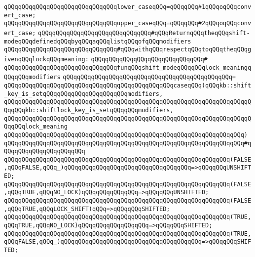 \verb|qQQqqQQqqQQqqQQqqQQqqQQqqQQqqQQqlower_caseqQQq=qQQqqQQq#1qQQqoqQQqconvert_case;|\newline
\verb|qQQqqQQqqQQqqQQqqQQqqQQqqQQqqQQqupper_caseqQQq=qQQqqQQq#2qQQqoqQQqconvert_case;|\newline
\newline
\verb|qQQqqQQqqQQqqQQqqQQqqQQqqQQqqQQq#qQQqReturnqQQqtheqQQqshift-modeqQQqdefinedqQQqbyqQQqaqQQqlistqQQqofqQQqmodifiers|\newline
\verb|qQQqqQQqqQQqqQQqqQQqqQQqqQQqqQQq#qQQqwithqQQqrespectqQQqtoqQQqtheqQQqgivenqQQqlockqQQqmeaning:|\newline
\verb|qQQqqQQqqQQqqQQqqQQqqQQqqQQqqQQq#|\newline
\verb|qQQqqQQqqQQqqQQqqQQqqQQqqQQqqQQqfunqQQqshift_modeqQQqqQQqlock_meaningqQQqqQQqmodifiers|\newline
\verb|qQQqqQQqqQQqqQQqqQQqqQQqqQQqqQQqqQQqqQQqqQQqqQQq=|\newline
\verb|qQQqqQQqqQQqqQQqqQQqqQQqqQQqqQQqqQQqqQQqqQQqqQQqcaseqQQq(qQQqkb::shift_key_is_setqQQqqQQqqQQqqQQqqQQqqQQqmodifiers,|\newline
\verb|qQQqqQQqqQQqqQQqqQQqqQQqqQQqqQQqqQQqqQQqqQQqqQQqqQQqqQQqqQQqqQQqqQQqqQQqqQQqkb::shiftlock_key_is_setqQQqqQQqmodifiers,|\newline
\verb|qQQqqQQqqQQqqQQqqQQqqQQqqQQqqQQqqQQqqQQqqQQqqQQqqQQqqQQqqQQqqQQqqQQqqQQqqQQqlock_meaning|\newline
\verb|qQQqqQQqqQQqqQQqqQQqqQQqqQQqqQQqqQQqqQQqqQQqqQQqqQQqqQQqqQQqqQQqqQQq)|\newline
\verb|qQQqqQQqqQQqqQQqqQQqqQQqqQQqqQQqqQQqqQQqqQQqqQQqqQQqqQQqqQQqqQQqqQQq#qQQqqQQqqQQqqQQqqQQqqQQq|\newline
\verb|qQQqqQQqqQQqqQQqqQQqqQQqqQQqqQQqqQQqqQQqqQQqqQQqqQQqqQQqqQQqqQQq(FALSE,qQQqFALSE,qQQq_)qQQqqQQqqQQqqQQqqQQqqQQqqQQqqQQqqQQq=>qQQqqQQqUNSHIFTED;|\newline
\verb|qQQqqQQqqQQqqQQqqQQqqQQqqQQqqQQqqQQqqQQqqQQqqQQqqQQqqQQqqQQqqQQq(FALSE,qQQqTRUE,qQQqNO_LOCK)qQQqqQQqqQQqqQQq=>qQQqqQQqUNSHIFTED;|\newline
\verb|qQQqqQQqqQQqqQQqqQQqqQQqqQQqqQQqqQQqqQQqqQQqqQQqqQQqqQQqqQQqqQQq(FALSE,qQQqTRUE,qQQqLOCK_SHIFT)qQQq=>qQQqqQQqSHIFTED;|\newline
\verb|qQQqqQQqqQQqqQQqqQQqqQQqqQQqqQQqqQQqqQQqqQQqqQQqqQQqqQQqqQQqqQQq(TRUE,qQQqTRUE,qQQqNO_LOCK)qQQqqQQqqQQqqQQqqQQq=>qQQqqQQqSHIFTED;|\newline
\verb|qQQqqQQqqQQqqQQqqQQqqQQqqQQqqQQqqQQqqQQqqQQqqQQqqQQqqQQqqQQqqQQq(TRUE,qQQqFALSE,qQQq_)qQQqqQQqqQQqqQQqqQQqqQQqqQQqqQQqqQQqqQQq=>qQQqqQQqSHIFTED;|\newline

